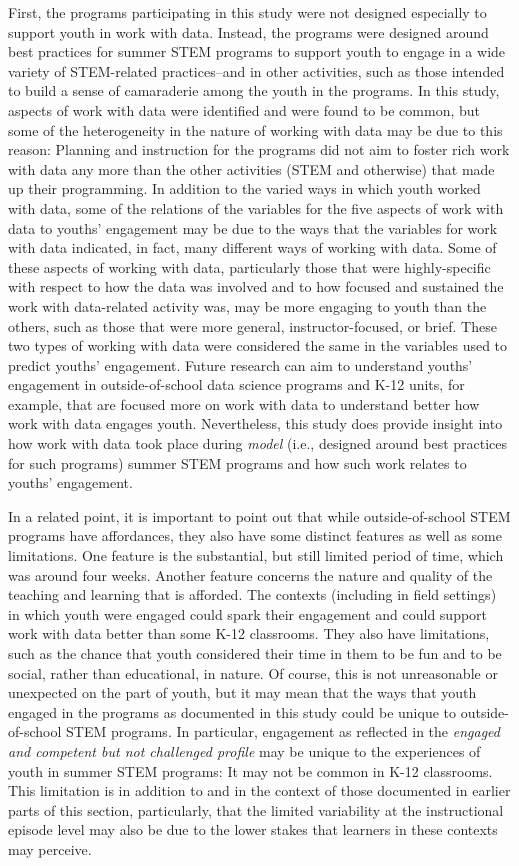 \documentclass[]{book}
\theoremstyle{definition}
\theoremstyle{definition}
\theoremstyle{definition}
\theoremstyle{remark}
\begin{document}
First, the programs participating in this study were not designed
especially to support youth in work with data. Instead, the programs
were designed around best practices for summer STEM programs to support
youth to engage in a wide variety of STEM-related practices--and in
other activities, such as those intended to build a sense of camaraderie
among the youth in the programs. In this study, aspects of work with
data were identified and were found to be common, but some of the
heterogeneity in the nature of working with data may be due to this
reason: Planning and instruction for the programs did not aim to foster
rich work with data any more than the other activities (STEM and
otherwise) that made up their programming. In addition to the varied
ways in which youth worked with data, some of the relations of the
variables for the five aspects of work with data to youths' engagement
may be due to the ways that the variables for work with data indicated,
in fact, many different ways of working with data. Some of these aspects
of working with data, particularly those that were highly-specific with
respect to how the data was involved and to how focused and sustained
the work with data-related activity was, may be more engaging to youth
than the others, such as those that were more general,
instructor-focused, or brief. These two types of working with data were
considered the same in the variables used to predict youths' engagement.
Future research can aim to understand youths' engagement in
outside-of-school data science programs and K-12 units, for example,
that are focused more on work with data to understand better how work
with data engages youth. Nevertheless, this study does provide insight
into how work with data took place during \emph{model} (i.e., designed
around best practices for such programs) summer STEM programs and how
such work relates to youths' engagement.

In a related point, it is important to point out that while
outside-of-school STEM programs have affordances, they also have some
distinct features as well as some limitations. One feature is the
substantial, but still limited period of time, which was around four
weeks. Another feature concerns the nature and quality of the teaching
and learning that is afforded. The contexts (including in field
settings) in which youth were engaged could spark their engagement and
could support work with data better than some K-12 classrooms. They also
have limitations, such as the chance that youth considered their time in
them to be fun and to be social, rather than educational, in nature. Of
course, this is not unreasonable or unexpected on the part of youth, but
it may mean that the ways that youth engaged in the programs as
documented in this study could be unique to outside-of-school STEM
programs. In particular, engagement as reflected in the \emph{engaged
and competent but not challenged profile} may be unique to the
experiences of youth in summer STEM programs: It may not be common in
K-12 classrooms. This limitation is in addition to and in the context of
those documented in earlier parts of this section, particularly, that
the limited variability at the instructional episode level may also be
due to the lower stakes that learners in these contexts may perceive.
\end{document}
